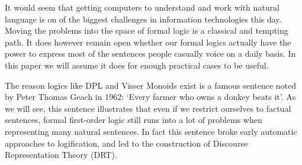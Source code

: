 \documentclass[12pt]{article}
\begin{document}
It would seem that getting computers to understand and work with natural language is on of the biggest challenges in information technologies this day. Moving the problems into the space of formal logic is a classical and tempting path. It does however remain open whether our formal logics actually have the power to express most of the sentences people casually voice on a daily basis. In this paper we will assume it does for enough practical cases to be useful.

The reason logics like DPL and Visser Monoids exist is a famous sentence noted by Peter Thomas Geach in 1962\cite{geach1962reference}: `Every farmer who owns a donkey beats it'. As we will see, this sentence illustrates that even if we restrict ourselves to factual sentences, formal first-order logic still runs into a lot of problems when representing many natural sentences. In fact this sentence broke early automatic approaches to logification, and led to the construction of Discourse Representation Theory (DRT)\cite{kamp1993discourse}.
\end{document}
